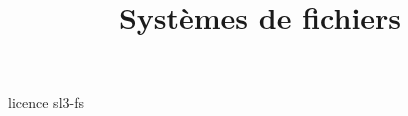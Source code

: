 \documentclass [xcolor=table] {beamer}
\title {Systèmes de fichiers}
\begin{document}
 {licence}
 {sl3-fs}
\end{document}
